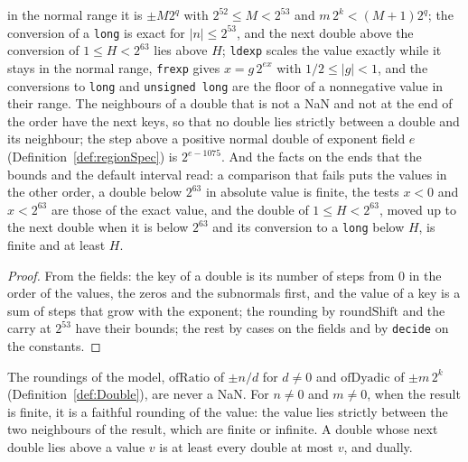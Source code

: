 \begin{lemma}
  in the normal range it is $\pm M 2^q$ with $2^{52} \le M < 2^{53}$ and $m\,2^k < (M + 1) 2^q$; the
  conversion of a \verb|long| is exact for $|n| \le 2^{53}$, and the next double above the
  conversion of $1 \le H < 2^{63}$ lies above $H$; \verb|ldexp| scales the value exactly while it
  stays in the normal range, \verb|frexp| gives $x = g\,2^{\mathit{ex}}$ with $1/2 \le |g| < 1$, and
  the conversions to \verb|long| and \verb|unsigned long| are the floor of a nonnegative value in
  their range.
  The neighbours of a double that is not a NaN and not at the end of the order have the next keys,
  so that no double lies strictly between a double and its neighbour; the step above a positive
  normal double of exponent field $e$ (Definition~\ref{def:regionSpec}) is $2^{e - 1075}$. And the
  facts on the ends that the bounds and the default interval read: a comparison that fails puts the
  values in the other order, a double below $2^{63}$ in absolute value is finite, the tests $x < 0$
  and $x < 2^{63}$ are those of the exact value, and the double of $1 \le H < 2^{63}$, moved up to
  the next double when it is below $2^{63}$ and its conversion to a \verb|long| below $H$, is finite
  and at least $H$.
\end{lemma}

\begin{proof}\leanok
  From the fields: the key of a double is its number of steps from $0$ in the order of the values,
  the zeros and the subnormals first, and the value of a key is a sum of steps that grow with the
  exponent; the rounding by $\mathrm{roundShift}$ and the carry at $2^{53}$ have their bounds; the
  rest by cases on the fields and by \verb|decide| on the constants.
\end{proof}

\begin{lemma}\label{lem:rounding}
  \leanok
  The roundings of the model, $\mathrm{ofRatio}$ of $\pm n/d$ for $d \ne 0$ and $\mathrm{ofDyadic}$
  of $\pm m\,2^k$ (Definition~\ref{def:Double}), are never a NaN. For $n \ne 0$ and $m \ne 0$, when
  the result is finite, it is a faithful rounding of the value: the value lies strictly between the
  two neighbours of the result, which are finite or infinite. A double whose next double lies above
  a value $v$ is at least every double at most $v$, and dually.
\end{lemma}

